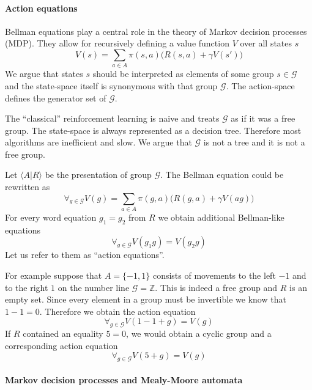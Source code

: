 \documentclass[12pt]{article}
\begin{document}
\paragraph{Action equations}
Bellman equations play a central role in the theory of Markov decision processes (MDP). They allow for recursively defining a value function $V$ over all states $s$
\[
V(s) = \sum_{a\in A} \pi(s,a) \big(R(s,a) + \gamma V(s')\big)
\]
We argue that states $s$ should be interpreted as elements of some group $s\in \mathcal{G}$ and the state-space itself is synonymous with that group $\mathcal{G}$.
The action-space defines the generator set of $\mathcal{G}$. 

The ``classical'' reinforcement learning is naive and treats $\mathcal{G}$ as if it was a free group. The state-space is always represented as a decision tree. Therefore most algorithms are inefficient and slow. We argue that $\mathcal{G}$ is not a tree and it is not a free group.

Let $\langle A| R\rangle$ be the presentation of group $\mathcal{G}$. The Bellman equation could be rewritten as
\[
\forall_{g\in \mathcal{G}} V(g) = \sum_{a\in A} \pi(g,a) \big(R(g,a) + \gamma V(ag)\big)
\]
For every word equation $g_1=g_2$ from $R$ we obtain additional Bellman-like equations
\[
\forall_{g\in \mathcal{G}} V(g_1g) = V(g_2g)
\]
Let us refer to them as ``action equations''.

For example suppose that $A=\{-1, 1\}$ consists of movements to the left $-1$ and to the right $1$ on the number line $\mathcal{G}=\mathbb{Z}$. This is indeed a free group and $R$ is an empty set. Since every element in a group must be invertible we know that $1-1=0$. Therefore we obtain the action equation
\[
\forall_{g\in \mathcal{G}} V(1-1+g) = V(g)
\]
If $R$ contained an equality $5=0$, we would obtain a cyclic group and a corresponding action equation
\[
\forall_{g\in \mathcal{G}} V(5+g) = V(g)
\]
\paragraph{Markov decision processes and Mealy-Moore automata}
\end{document}
